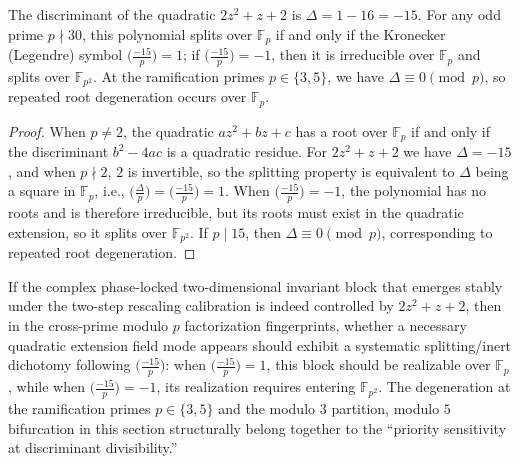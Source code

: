\begin{proposition}\label{prop:pom-phase-lock-discriminant-minus15-splitting}
The discriminant of the quadratic \(2z^2+z+2\) is \(\Delta=1-16=-15\).
For any odd prime \(p\nmid 30\), this polynomial splits over \(\mathbb{F}_p\) if and only if the Kronecker (Legendre) symbol \(\bigl(\frac{-15}{p}\bigr)=1\);
if \(\bigl(\frac{-15}{p}\bigr)=-1\), then it is irreducible over \(\mathbb{F}_p\) and splits over \(\mathbb{F}_{p^{2}}\).
At the ramification primes \(p\in\{3,5\}\), we have \(\Delta\equiv 0\pmod p\), so repeated root degeneration occurs over \(\mathbb{F}_p\).
\end{proposition}
\begin{proof}
When \(p\ne 2\), the quadratic \(az^2+bz+c\) has a root over \(\mathbb{F}_p\) if and only if the discriminant \(b^2-4ac\) is a quadratic residue.
For \(2z^2+z+2\) we have \(\Delta=-15\), and when \(p\nmid 2\), \(2\) is invertible, so the splitting property is equivalent to \(\Delta\) being a square in \(\mathbb{F}_p\),
i.e., \(\bigl(\frac{\Delta}{p}\bigr)=\bigl(\frac{-15}{p}\bigr)=1\).
When \(\bigl(\frac{-15}{p}\bigr)=-1\), the polynomial has no roots and is therefore irreducible, but its roots must exist in the quadratic extension, so it splits over \(\mathbb{F}_{p^2}\).
If \(p\mid 15\), then \(\Delta\equiv 0\pmod p\), corresponding to repeated root degeneration.
\end{proof}

\begin{remark}\label{rem:pom-phase-lock-discriminant-minus15-prediction}
If the complex phase-locked two-dimensional invariant block that emerges stably under the two-step rescaling calibration is indeed controlled by \(2z^2+z+2\),
then in the cross-prime modulo \(p\) factorization fingerprints, whether a necessary quadratic extension field mode appears should exhibit a systematic splitting/inert dichotomy following \(\bigl(\frac{-15}{p}\bigr)\):
when \(\bigl(\frac{-15}{p}\bigr)=1\), this block should be realizable over \(\mathbb{F}_p\), while when \(\bigl(\frac{-15}{p}\bigr)=-1\), its realization requires entering \(\mathbb{F}_{p^2}\).
The degeneration at the ramification primes \(p\in\{3,5\}\) and the modulo \(3\) partition, modulo \(5\) bifurcation in this section structurally belong together to the ``priority sensitivity at discriminant divisibility.''
\end{remark}

